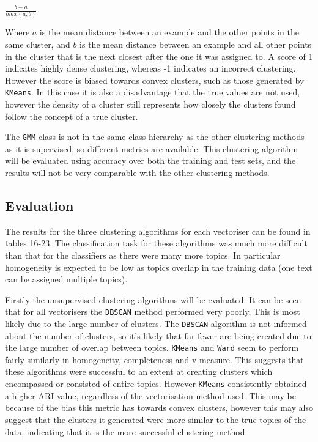 \documentclass{article}
\begin{document}
\begin{center}
$\frac{b-a}{max(a,b)}$
\end{center}

Where $a$ is the mean distance between an example and the other points in the same cluster, and $b$ is the mean distance between an example and all other points in the cluster that is the next closest after the one it was assigned to. A score of 1 indicates highly dense clustering, whereas -1 indicates an incorrect clustering. However the score is biased towards convex clusters, such as those generated by \verb|KMeans|. In this case it is also a disadvantage that the true values are not used, however the density of a cluster still represents how closely the clusters found follow the concept of a true cluster.

The \verb|GMM| class is not in the same class hierarchy as the other clustering methods as it is supervised, so different metrics are available. This clustering algorithm will be evaluated using accuracy over both the training and test sets, and the results will not be very comparable with the other clustering methods.  

\subsection{Evaluation}
The results for the three clustering algorithms for each vectoriser can be found in tables 16-23. The classification task for these algorithms was much more difficult than that for the classifiers as there were many more topics. In particular homogeneity is expected to be low as topics overlap in the training data (one text can be assigned multiple topics).

Firstly the unsupervised clustering algorithms will be evaluated. It can be seen that for all vectorisers the \verb|DBSCAN| method performed very poorly. This is most likely due to the large number of clusters. The \verb|DBSCAN| algorithm is not informed about the number of clusters, so it's likely that far fewer are being created due to the large number of overlap between topics. \verb|KMeans| and \verb|Ward| seem to perform fairly similarly in homogeneity, completeness and v-measure. This suggests that these algorithms were successful to an extent at creating clusters which encompassed or consisted of entire topics. However \verb|KMeans| consistently obtained a higher ARI value, regardless of the vectorisation method used. This may be because of the bias this metric has towards convex clusters, however this may also suggest that the clusters it generated were more similar to the true topics of the data, indicating that it is the more successful clustering method.
\end{document}
